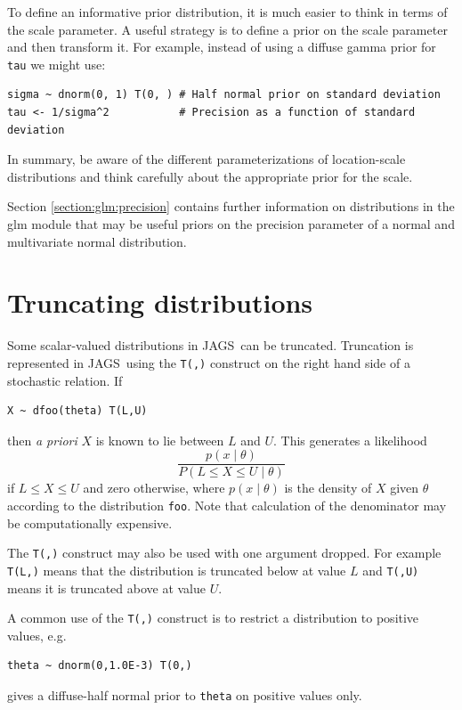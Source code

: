 \documentclass[11pt, a4paper, titlepage]{report}
\newcommand{\JAGS}{\textsf{JAGS}}
\begin{document}
To define an informative prior distribution, it is much easier to
think in terms of the scale parameter. A useful strategy is to define
a prior on the scale parameter and then transform it. For example,
instead of using a diffuse gamma prior for \texttt{tau} we might use:
\begin{verbatim}
sigma ~ dnorm(0, 1) T(0, ) # Half normal prior on standard deviation
tau <- 1/sigma^2           # Precision as a function of standard deviation
\end{verbatim}

In summary, be aware of the different parameterizations of
location-scale distributions and think carefully about the appropriate
prior for the scale.

Section \ref{section:glm:precision} contains further information on
distributions in the \textsf{glm} module that may be useful priors on
the precision parameter of a normal and multivariate normal
distribution.

\section{Truncating distributions}
\label{section:truncation}

Some scalar-valued distributions in \JAGS\ can be truncated.
Truncation is represented in \JAGS\ using the \texttt{T(,)}
construct on the right hand side of a stochastic relation. If
\begin{verbatim}
X ~ dfoo(theta) T(L,U)
\end{verbatim}
then {\em a priori} $X$ is known to lie between $L$ and $U$. This
generates a likelihood
\[
\frac{p(x \mid \theta)}{P(L \leq X \leq U \mid \theta)}
\]
if $L \leq X \leq U$ and zero otherwise, where $p(x \mid \theta)$ is
the density of $X$ given $\theta$ according to the distribution
\texttt{foo}. Note that calculation of the denominator may be
computationally expensive.

The \texttt{T(,)} construct may also be used with one argument
dropped.  For example \texttt{T(L,)} means that the distribution is
truncated below at value $L$ and \texttt{T(,U)} means it is truncated
above at value $U$.

A common use of the \texttt{T(,)} construct is to restrict a
distribution to positive values, e.g.
\begin{verbatim}
theta ~ dnorm(0,1.0E-3) T(0,)
\end{verbatim}
gives a diffuse-half normal prior to \texttt{theta} on positive values
only.
\end{document}
